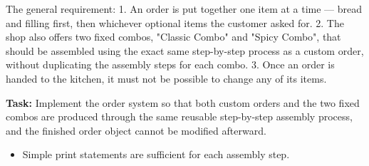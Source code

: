 \documentclass[11pt]{article}
\begin{document}
\vspace{6pt}
\noindent
The general requirement: 1. An order is put together one item at a time --- bread and filling first, then whichever optional items the customer asked for. 2. The shop also offers two fixed combos, "Classic Combo" and "Spicy Combo", that should be assembled using the exact same step-by-step process as a custom order, without duplicating the assembly steps for each combo. 3. Once an order is handed to the kitchen, it must not be possible to change any of its items.

\vspace{6pt}
\noindent
\textbf{Task:} Implement the order system so that both custom orders and the two fixed combos are produced through the same reusable step-by-step assembly process, and the finished order object cannot be modified afterward.
\begin{itemize}[nosep]
    \item Simple print statements are sufficient for each assembly step.
\end{itemize}
\end{document}
